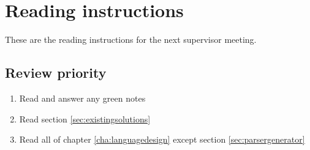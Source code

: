 \chapter{Reading instructions}
These are the reading instructions for the next supervisor meeting. 

\section{Review priority}
\begin{enumerate}
    \item Read and answer any green notes
    \item Read section \ref{sec:existingsolutions}
    \item Read all of chapter \ref{cha:languagedesign} except section \ref{sec:parsergenerator}
\end{enumerate}